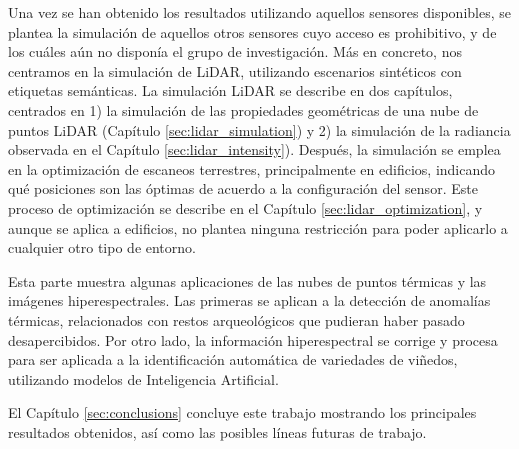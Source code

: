 \small {} \normalsize\hspace{3mm} Una vez se han obtenido los resultados utilizando aquellos sensores disponibles, se plantea la simulación de aquellos otros sensores cuyo acceso es prohibitivo, y de los cuáles aún no disponía el grupo de investigación. Más en concreto, nos centramos en la simulación de LiDAR, utilizando escenarios sintéticos con etiquetas semánticas. La simulación LiDAR se describe en dos capítulos, centrados en 1) la simulación de las propiedades geométricas de una nube de puntos LiDAR (Capítulo \ref{sec:lidar_simulation}) y 2) la simulación de la radiancia observada en el Capítulo \ref{sec:lidar_intensity}). Después, la simulación se emplea en la optimización de escaneos terrestres, principalmente en edificios, indicando qué posiciones son las óptimas de acuerdo a la configuración del sensor. Este proceso de optimización se describe en el Capítulo \ref{sec:lidar_optimization}, y aunque se aplica a edificios, no plantea ninguna restricción para poder aplicarlo a cualquier otro tipo de entorno.

\small {} \normalsize\hspace{3mm} Esta parte muestra algunas aplicaciones de las nubes de puntos térmicas y las imágenes hiperespectrales. Las primeras se aplican a la detección de anomalías térmicas, relacionados con restos arqueológicos que pudieran haber pasado desapercibidos. Por otro lado, la información hiperespectral se corrige y procesa para ser aplicada a la identificación automática de variedades de viñedos, utilizando modelos de Inteligencia Artificial. 

\small {} \normalsize\hspace{3mm} El Capítulo \ref{sec:conclusions} concluye este trabajo mostrando los principales resultados obtenidos, así como las posibles líneas futuras de trabajo.